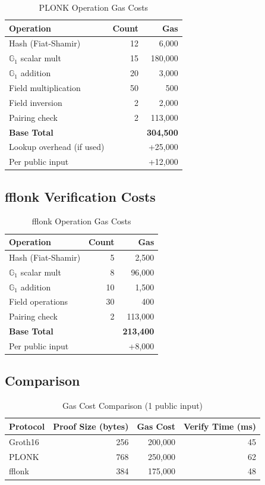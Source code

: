 \documentclass[11pt,a4paper]{article}
\theoremstyle{definition}
\begin{document}
\begin{table}[h]
\centering
\caption{PLONK Operation Gas Costs}
\begin{tabular}{lrr}
\toprule
Operation & Count & Gas \\
\midrule
Hash (Fiat-Shamir) & 12 & 6,000 \\
$\mathbb{G}_1$ scalar mult & 15 & 180,000 \\
$\mathbb{G}_1$ addition & 20 & 3,000 \\
Field multiplication & 50 & 500 \\
Field inversion & 2 & 2,000 \\
Pairing check & 2 & 113,000 \\
\midrule
\textbf{Base Total} & & \textbf{304,500} \\
Lookup overhead (if used) & & +25,000 \\
Per public input & & +12,000 \\
\bottomrule
\end{tabular}
\end{table}

\subsection{fflonk Verification Costs}

\begin{table}[h]
\centering
\caption{fflonk Operation Gas Costs}
\begin{tabular}{lrr}
\toprule
Operation & Count & Gas \\
\midrule
Hash (Fiat-Shamir) & 5 & 2,500 \\
$\mathbb{G}_1$ scalar mult & 8 & 96,000 \\
$\mathbb{G}_1$ addition & 10 & 1,500 \\
Field operations & 30 & 400 \\
Pairing check & 2 & 113,000 \\
\midrule
\textbf{Base Total} & & \textbf{213,400} \\
Per public input & & +8,000 \\
\bottomrule
\end{tabular}
\end{table}

\subsection{Comparison}

\begin{table}[h]
\centering
\caption{Gas Cost Comparison (1 public input)}
\begin{tabular}{lrrr}
\toprule
Protocol & Proof Size (bytes) & Gas Cost & Verify Time (ms) \\
\midrule
Groth16 & 256 & 200,000 & 45 \\
PLONK & 768 & 250,000 & 62 \\
fflonk & 384 & 175,000 & 48 \\
\bottomrule
\end{tabular}
\end{table}
\end{document}
